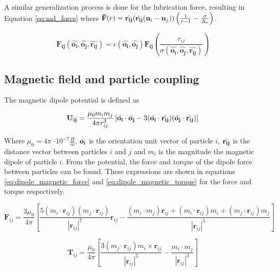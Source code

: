 A similar generalization process is done for the lubrication force, resulting in Equation \ref{eq:md_force} where 
$\mathbf{\Bar{F}}(r) = \hat{\mathbf{r_{ij}}}(\hat{\mathbf{r_{ij}}}(\mathbf{u}_i - \mathbf{u}_j))\left( \frac{1}{r - 1} - 
\frac{\sigma}{\Delta_{c}} \right)$. 

\begin{equation}
    \mathbf{F_{ij}}(\hat{\mathbf{o_i}}, \hat{\mathbf{o_j}}, \hat{\mathbf{r_{ij}}}) = \epsilon(\hat{\mathbf{o_i}}, 
    \hat{\mathbf{o_j}})\mathbf{\mathbf{F_{ij}}}\left( \frac{r_{ij}}{\sigma(\hat{\mathbf{o_i}}, \hat{\mathbf{o_j}}, 
    \hat{\mathbf{r_{ij}}})} \right)
    \label{eq:md_force}
\end{equation}

\subsection{Magnetic field and particle coupling}

The magnetic dipole potential is defined as

\begin{equation}
    \mathbf{U_{ij}} = \frac{\mu_0 m_i m_j}{4\pi r_{ij}^{3}} \left[ \Hat{\mathbf{o_i}} \cdot \Hat{\mathbf{o_j}} - 
    3(\Hat{\mathbf{o_i}} \cdot \Hat{\mathbf{r_{ij}}})(\Hat{\mathbf{o_j}} \cdot \Hat{\mathbf{r_{ij}}}) \right]
    \label{eq:magnet_potential}
\end{equation}

Where $\mu_0 = 4\pi \cdot 10^{-7} \frac{H}{m}$,  $\Hat{\mathbf{o_i}}$ is the orientation unit vector of particle 
$i$, $\Hat{\mathbf{r_{ij}}}$ is the distance vector between particles $i$ and $j$ and $m_i$ is the magnitude the 
magnetic dipole of particle $i$. From the potential, the force and torque of the dipole force between particles 
can be found. These expressions are shown in equations \ref{eq:dipole_magnetic_force} and \ref{eq:dipole_magnetic_torque} 
for the force and torque respectively.

\begin{equation}
    \mathbf{F}_{ij} = \frac{3 \mu_0}{4 \pi} [\frac{5(m_i \cdot \mathbf{r}_{ij})(m_j 
    \cdot \mathbf{r}_{ij})}{|\mathbf{r}_{ij}|^7}\mathbf{r}_{ij} - \frac{(m_i \cdot m_{j})\mathbf{r}_{ij} + 
    (m_i \cdot \mathbf{r}_{ij})m_i + (m_j \cdot \mathbf{r}_{ij})m_j }{|\mathbf{r}_{ij}|^5}]
\label{eq:dipole_magnetic_force}
\end{equation}

\begin{equation}
    \mathbf{T}_{ij} = \frac{\mu_0}{4 \pi}[ \frac{3(m_j \cdot \mathbf{r}_{ij})m_i \times \mathbf{r}_{ij} }
    {|\mathbf{r}_{ij}|^5} - \frac{m_i \cdot m_j }{|\mathbf{r}_{ij}|^3} ]
    \label{eq:dipole_magnetic_torque}
\end{equation}

